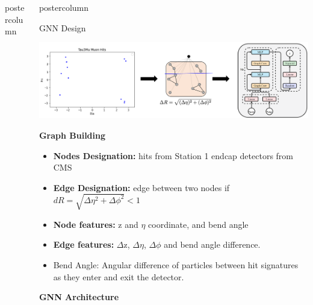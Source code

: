 \documentclass[final,hyperref={pdfpagelabels=false}]{beamer}
\newlength{\columnheight}
\begin{document}
\begin{frame}
\begin{columns}
\begin{column}{.49\textwidth}
\begin{beamercolorbox}[center,wd=\textwidth]{postercolumn}
\begin{minipage}[T]{.95\textwidth}
{                }
              \end{minipage}
            \end{beamercolorbox}
          \end{column}

    \begin{column}{.49\textwidth}
      \begin{beamercolorbox}[center,wd=\textwidth]{postercolumn}
        \begin{minipage}[T]{.95\textwidth} 
          \parbox[t][\columnheight]{\textwidth}{
            
            \begin{block}{GNN Design}
                  \begin{center}
                    \includegraphics[width=\linewidth]{figures/graph_creation.png}
                  \end{center}
                \vspace{0.5in}
                \textbf{Graph Building}
                \begin{itemize}
                \item \textbf{Nodes Designation:} hits from Station 1 endcap detectors from CMS
                \item \textbf{Edge Designation:} edge between two nodes if $dR = \sqrt{\Delta \eta^2 + \Delta \phi^2} < 1$
                \item \textbf{Node features:} z and $\eta$ coordinate, and bend angle
                \item \textbf{Edge features:} $\Delta$z, $\Delta \eta$, $\Delta \phi$ and bend angle difference.
                \item Bend Angle: Angular difference of particles between hit signatures as they enter and exit the detector.
                \end{itemize}
                \vspace{0.2in}
                \textbf{GNN Architecture}

\end{block}}
\end{minipage}
\end{beamercolorbox}
\end{column}
\end{columns}
\end{frame}
\end{document}
